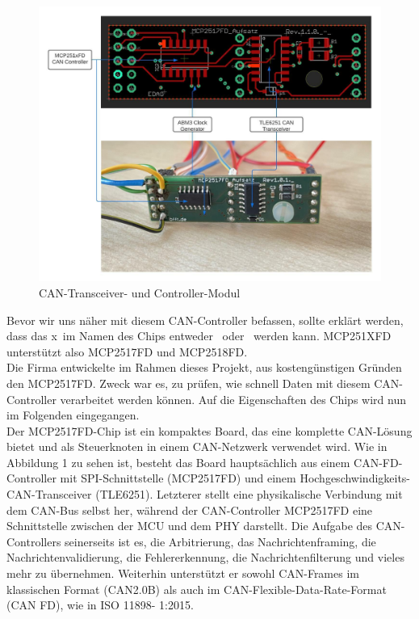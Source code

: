 \begin{figure}[H]
	\begin{center}
		\includegraphics[width=1\textwidth]{./images/mcp_ic_phy.jpg}
	\end{center}
	\vspace{-5pt}
	\caption[CAN-Transceiver- und Controller-Modul]{CAN-Transceiver- und Controller-Modul} %
	\label{fig:can:controller:transciever}
	\vspace{-5pt}
\end{figure}
Bevor wir uns näher mit diesem CAN-Controller befassen, sollte erklärt werden, dass das \grqq x\grqq\ im Namen des Chips entweder \grqq\ oder \grqq\ werden kann. MCP251XFD unterstützt also MCP2517FD und MCP2518FD.\\
Die Firma entwickelte im Rahmen dieses Projekt, aus kostengünstigen Gründen den  MCP2517FD. Zweck war es, zu prüfen, wie schnell Daten mit diesem CAN-Controller verarbeitet werden können. Auf die Eigenschaften des Chips wird nun im Folgenden eingegangen.\\
Der MCP2517FD-Chip ist ein kompaktes Board, das eine komplette CAN-Lösung bietet und als Steuerknoten in einem CAN-Netzwerk verwendet wird. Wie in Abbildung 1 zu sehen ist, besteht das Board hauptsächlich aus einem CAN-FD-Controller mit SPI-Schnittstelle (MCP2517FD) und einem Hochgeschwindigkeits-CAN-Transceiver (TLE6251). Letzterer stellt eine physikalische Verbindung mit dem CAN-Bus selbst her, während der CAN-Controller MCP2517FD eine Schnittstelle zwischen der MCU und dem PHY darstellt. Die Aufgabe des CAN-Controllers seinerseits ist es, die Arbitrierung, das Nachrichtenframing, die Nachrichtenvalidierung, die Fehlererkennung, die Nachrichtenfilterung und vieles mehr zu übernehmen. Weiterhin unterstützt er sowohl CAN-Frames im klassischen Format (CAN2.0B) als auch im CAN-Flexible-Data-Rate-Format (CAN FD), wie in ISO 11898- 1:2015.\\
